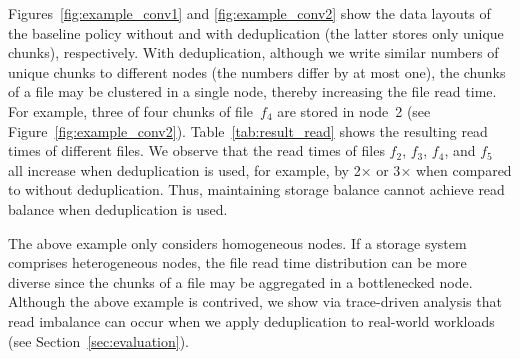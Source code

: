 Figures~\ref{fig:example_conv1} and \ref{fig:example_conv2} show the data
layouts of the baseline policy without and with deduplication (the latter
stores only unique chunks), respectively.  
With deduplication, although we
write similar numbers of unique chunks to different nodes (the numbers
differ by at most one), the chunks of a file may be clustered in a
single node, thereby increasing the file read time.  For example, three of
four chunks of file~$f_4$ are stored in node~2 (see
Figure~\ref{fig:example_conv2}).  Table~\ref{tab:result_read} shows the
resulting read times of different files.  We observe that the read times of
files $f_2$, $f_3$, $f_4$, and $f_5$ all increase when deduplication is used,
for example, by 2$\times$ or 3$\times$ when compared to without deduplication.
Thus, maintaining storage balance cannot achieve read balance when
deduplication is used. 

The above example only considers homogeneous nodes.  If a storage system
comprises heterogeneous nodes, the file read time distribution can be more
diverse since the chunks of a file may be aggregated in a bottlenecked
node.  Although the above example is contrived, we show via trace-driven
analysis that read imbalance can occur when we apply deduplication to
real-world workloads (see Section~\ref{sec:evaluation}). 


